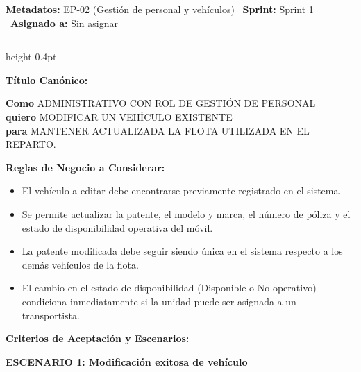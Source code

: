 \documentclass[a4paper,9pt]{article}
\begin{document}
\begin{tcolorbox}[hucard, title={\textbf{HU-45: MODIFICAR VEHÍCULO} \hfill \scriptsize \colorbox{bluestatus}{\textbf{\ New\ }} \quad \colorbox{white}{\textcolor{primarydark}{\textbf{\ 2 pts\ }}}}]
\vspace{-1pt}
\noindent\textbf{\footnotesize Metadatos:} EP-02 (Gestión de personal y vehículos) \textbar\ \textbf{Sprint:} Sprint 1 \textbar\ \textbf{Asignado a:} Sin asignar\par\vspace{2pt}
\hrule height 0.4pt\par\vspace{3pt}
\noindent\textbf{\footnotesize Título Canónico:}\par\vspace{1pt}
{\small \textbf{Como} ADMINISTRATIVO CON ROL DE GESTIÓN DE PERSONAL \\ \textbf{quiero} MODIFICAR UN VEHÍCULO EXISTENTE \\ \textbf{para} MANTENER ACTUALIZADA LA FLOTA UTILIZADA EN EL REPARTO.}\par\vspace{3pt}
\noindent\textbf{\footnotesize Reglas de Negocio a Considerar:}\par\vspace{1pt}
{\footnotesize
\begin{itemize}[leftmargin=12pt, nosep, itemsep=1.5pt, topsep=1pt]
\item El vehículo a editar debe encontrarse previamente registrado en el sistema.
\item Se permite actualizar la patente, el modelo y marca, el número de póliza y el estado de disponibilidad operativa del móvil.
\item La patente modificada debe seguir siendo única en el sistema respecto a los demás vehículos de la flota.
\item El cambio en el estado de disponibilidad (Disponible o No operativo) condiciona inmediatamente si la unidad puede ser asignada a un transportista.
\end{itemize}
}\par\vspace{3pt}
\noindent\textbf{\footnotesize Criterios de Aceptación y Escenarios:}\par\vspace{2pt}
{\footnotesize
\noindent\textbf{\textcolor{secondarydark}{ESCENARIO 1:  Modificación exitosa de vehículo}}\par\vspace{1pt}
}
\end{tcolorbox}
\end{document}
